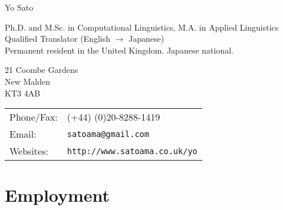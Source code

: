 \documentclass[a4paper]{article}
\def\name{Yo Sato}
\begin{document}
{\huge \name}

\smallskip

Ph.D. and M.Sc. in Computational Linguistics, M.A. in Applied Linguistics\\
Qualified Translator (English $\rightarrow$ Japanese)\\
Permanent resident in the United Kingdom. Japanese national.

\bigskip

\begin{minipage}{0.3\linewidth}
  21 Coombe Gardens\\
  New Malden\\
  KT3 4AB
\end{minipage}
\begin{minipage}{0.45\linewidth}
  \begin{tabular}{ll}
    Phone/Fax: &  (+44) (0)20-8288-1419 \\
    Email: & {\tt satoama@gmail.com} \\
    Websites:     & {\tt\small http://www.satoama.co.uk/yo}
  \end{tabular}
\end{minipage}




\education{}

\vspace{-5mm}

\section*{Employment}
\end{document}
